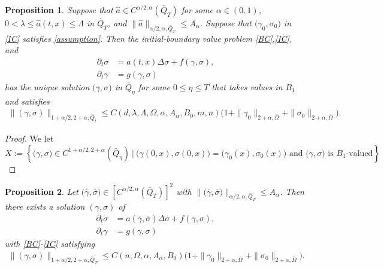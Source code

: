 \documentclass[a4paper,11pt]{article}
\newtheorem{proposition}{Proposition}[section]
\theoremstyle{remark}
\begin{document}
\begin{proposition} Suppose that $\hat{a}\in C^{\alpha/2,\alpha}(\bar{Q}_T)$ for some $\alpha \in (0,1)$, $0<\lambda \le \hat{a}(t,x) \le \Lambda$ in $\bar{Q}_T$, and $\|\hat{a}\|_{\alpha/2,\alpha,\bar{Q}_T} \le A_\alpha$. Suppose that $\big(\gamma_0,\sigma_0\big)$ in \eqref{IC} satisfies \eqref{assumption}. Then the initial-boundary value problem \eqref{BC},\eqref{IC}, and
\begin{equation} \label{Aux1}
\begin{aligned}
 \partial_t \sigma &= a(t,x) \Delta \sigma + f(\gamma,\sigma) ,\\
 \partial_t \gamma &= g(\gamma,\sigma)
\end{aligned}
\end{equation}
has the unique solution $\big(\gamma,\sigma\big)$ in $\bar{Q}_\eta$ for some $0\le\eta\le T$ that takes values in $B_1$ and satisfies
\begin{align*}
 \|(\gamma,\sigma)\|_{1+\alpha/2, 2+\alpha,\bar{Q}_{\bar{t}}} \le C(d,\lambda,\Lambda,\Omega,\alpha,A_\alpha,B_0,m,n) \Big(1 + \|\gamma_0\|_{2+\alpha,\bar\Omega} +  \|\sigma_0\|_{2+\alpha,\bar\Omega}\Big).
\end{align*}
\end{proposition}

\begin{proof} 
 We let $$X := \left\{ \big(\gamma,\sigma\big) \in C^{1+\alpha/2,2+\alpha}(\bar{Q}_\eta) ~\Big|~ \big(\gamma(0,x),\sigma(0,x)\big) = \big(\gamma_0(x),\sigma_0(x)\big)  \text{ and $\big(\gamma,\sigma\big)$ is $B_1$-valued} \right\}$$
 
 
 \end{proof}



\begin{proposition} Let $\big(\bar{\gamma},\bar{\sigma}\big) \in \left[C^{\alpha/2,\alpha}(\bar{Q}_T)\right]^2$ with $\|\big(\bar\gamma,\bar\sigma\big)\|_{\alpha/2,\alpha,\bar{Q}_T} \le A_\alpha$. Then there exists a solution $(\gamma,\sigma)$ of
\begin{equation}
\begin{aligned}
 \partial_t \sigma &= a(\bar\gamma,\bar\sigma) \Delta \sigma + f(\gamma,\sigma) ,\\
 \partial_t \gamma &= g(\gamma,\sigma) 
\end{aligned}
\end{equation}
with \eqref{BC}-\eqref{IC} satisfying
\begin{align*}
 \|(\gamma,\sigma)\|_{1+\alpha/2, 2+\alpha,\bar{Q}_T} \le C(n,\Omega,\alpha,A_\alpha,B_0) \Big(1 + \|\gamma_0\|_{2+\alpha,\bar\Omega} +  \|\sigma_0\|_{2+\alpha,\bar\Omega}\Big).
\end{align*}
\end{proposition}
\end{document}
